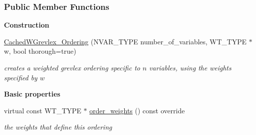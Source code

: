 \subsubsection*{Public Member Functions}
\begin{Indent}\textbf{ Construction}\par
\begin{DoxyCompactItemize}
\item 
\hyperlink{group__orderinggroup_a107617c77aaebe5ba74973af66ab75b6}{Cached\+W\+Grevlex\+\_\+\+Ordering} (N\+V\+A\+R\+\_\+\+T\+Y\+PE number\+\_\+of\+\_\+variables, W\+T\+\_\+\+T\+Y\+PE $\ast$w, bool thorough=true)
\begin{DoxyCompactList}\small\item\em creates a weighted grevlex ordering specific to $n$ variables, using the weights specified by $w$ \end{DoxyCompactList}\end{DoxyCompactItemize}
\end{Indent}
\begin{Indent}\textbf{ Basic properties}\par
\begin{DoxyCompactItemize}
\item 
\mbox{\label{group__orderinggroup_a4997585d5bc84222551e555eac13ebf9}} 
virtual const W\+T\+\_\+\+T\+Y\+PE $\ast$ \hyperlink{group__orderinggroup_a4997585d5bc84222551e555eac13ebf9}{order\+\_\+weights} () const override
\begin{DoxyCompactList}\small\item\em the weights that define this ordering \end{DoxyCompactList}\end{DoxyCompactItemize}
\end{Indent}
